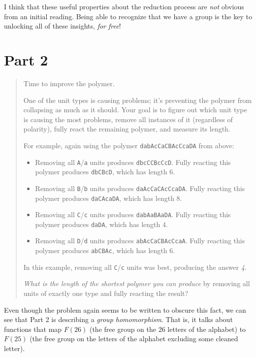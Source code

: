 \documentclass[]{article}
\begin{document}
I think that these useful properties about the reduction process are \emph{not}
obvious from an initial reading. Being able to recognize that we have a group is
the key to unlocking all of these insights, \emph{for free}!

\section{Part 2}\label{part-2}

\begin{quote}
Time to improve the polymer.

One of the unit types is causing problems; it's preventing the polymer from
collapsing as much as it should. Your goal is to figure out which unit type is
causing the most problems, remove all instances of it (regardless of polarity),
fully react the remaining polymer, and measure its length.

For example, again using the polymer \texttt{dabAcCaCBAcCcaDA} from above:

\begin{itemize}
\tightlist
\item
  Removing all \texttt{A}/\texttt{a} units produces \texttt{dbcCCBcCcD}. Fully
  reacting this polymer produces \texttt{dbCBcD}, which has length 6.
\item
  Removing all \texttt{B}/\texttt{b} units produces \texttt{daAcCaCAcCcaDA}.
  Fully reacting this polymer produces \texttt{daCAcaDA}, which has length 8.
\item
  Removing all \texttt{C}/\texttt{c} units produces \texttt{dabAaBAaDA}. Fully
  reacting this polymer produces \texttt{daDA}, which has length 4.
\item
  Removing all \texttt{D}/\texttt{d} units produces \texttt{abAcCaCBAcCcaA}.
  Fully reacting this polymer produces \texttt{abCBAc}, which has length 6.
\end{itemize}

In this example, removing all \texttt{C}/\texttt{c} units was best, producing
the answer \emph{4}.

\emph{What is the length of the shortest polymer you can produce} by removing
all units of exactly one type and fully reacting the result?
\end{quote}

Even though the problem again seems to be written to obscure this fact, we can
see that Part 2 is describing a \emph{group homomorphism}. That is, it talks
about functions that map \(F(26)\) (the free group on the 26 letters of the
alphabet) to \(F(25)\) (the free group on the letters of the alphabet excluding
some cleaned letter).
\end{document}
